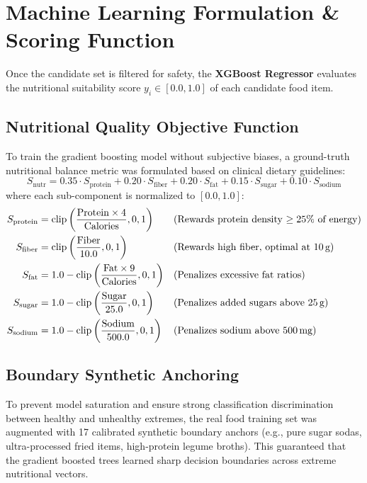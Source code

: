 \documentclass[12pt,a4paper]{report}
\begin{document}
\section{Machine Learning Formulation \& Scoring Function}

Once the candidate set is filtered for safety, the \textbf{XGBoost Regressor} evaluates the nutritional suitability score $y_i \in [0.0, 1.0]$ of each candidate food item.

\subsection{Nutritional Quality Objective Function}
To train the gradient boosting model without subjective biases, a ground-truth nutritional balance metric was formulated based on clinical dietary guidelines:
\begin{equation}
  S_{\text{nutr}} = 0.35 \cdot S_{\text{protein}} + 0.20 \cdot S_{\text{fiber}} + 0.20 \cdot S_{\text{fat}} + 0.15 \cdot S_{\text{sugar}} + 0.10 \cdot S_{\text{sodium}}
\end{equation}
where each sub-component is normalized to $[0.0, 1.0]$:
\begin{align}
  S_{\text{protein}} &= \text{clip}\left(\frac{\text{Protein} \times 4}{\text{Calories}}, 0, 1\right) && \text{(Rewards protein density $\ge 25\%$ of energy)} \\
  S_{\text{fiber}}   &= \text{clip}\left(\frac{\text{Fiber}}{10.0}, 0, 1\right) && \text{(Rewards high fiber, optimal at 10\,g)} \\
  S_{\text{fat}}     &= 1.0 - \text{clip}\left(\frac{\text{Fat} \times 9}{\text{Calories}}, 0, 1\right) && \text{(Penalizes excessive fat ratios)} \\
  S_{\text{sugar}}   &= 1.0 - \text{clip}\left(\frac{\text{Sugar}}{25.0}, 0, 1\right) && \text{(Penalizes added sugars above 25\,g)} \\
  S_{\text{sodium}}  &= 1.0 - \text{clip}\left(\frac{\text{Sodium}}{500.0}, 0, 1\right) && \text{(Penalizes sodium above 500\,mg)}
\end{align}

\subsection{Boundary Synthetic Anchoring}
To prevent model saturation and ensure strong classification discrimination between healthy and unhealthy extremes, the real food training set was augmented with 17 calibrated synthetic boundary anchors (e.g., pure sugar sodas, ultra-processed fried items, high-protein legume broths). This guaranteed that the gradient boosted trees learned sharp decision boundaries across extreme nutritional vectors.
\end{document}
